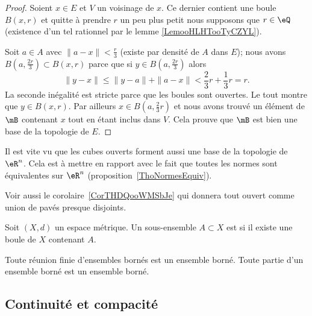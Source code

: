 \begin{proof}
	Soient \( x\in E\) et \( V\) un voisinage de \( x\). Ce dernier contient une boule \( B(x,r)\) et quitte à prendre \( r\) un peu plus petit nous supposons que \( r\in \eQ\) (existence d'un tel rationnel par le lemme \ref{LemooHLHTooTyCZYL}).

	Soit \( a\in A\) avec \( \| a-x \|<\frac{ r }{ 3 }\) (existe par densité de \( A\) dans \( E\)); nous avons \( B(a,\frac{ 2r }{ 3 })\subset B(x,r)\) parce que si \( y\in B( a,\frac{ 2r }{ 3 } )\) alors
	\begin{equation}
		\| y-x \|\leq \| y-a \|+\| a-x \|<\frac{ 2 }{ 3 }r+\frac{ 1 }{ 3 }r=r.
	\end{equation}
	La seconde inégalité est stricte parce que les boules sont ouvertes. Le tout montre que \( y\in B(x,r)\). Par ailleurs \( x\in B(a,\frac{ 2 }{ 3 }r)\) et nous avons trouvé un élément de \( \mB\) contenant \( x\) tout en étant inclus dans \( V\). Cela prouve que \( \mB\) est bien une base de la topologie de \( E\).
\end{proof}


\begin{remark}      \label{RemIPVLooHUXyeW}
	Il est vite vu que les cubes ouverts forment aussi une base de la topologie de \( \eR^n\). Cela est à mettre en rapport avec le fait que toutes les normes sont équivalentes sur \( \eR^n\) (proposition~\ref{ThoNormesEquiv}).


	Voir aussi le corolaire~\ref{CorTHDQooWMSbJe} qui donnera tout ouvert comme union de pavés presque disjoints.
\end{remark}

\begin{definition}\label{DefEnsembleBorne}
	Soit \( (X, d) \) un espace métrique. Un sous-ensemble \( A \subset X\) est  si il existe une boule de \( X\) contenant \( A\).
\end{definition}

\begin{proposition}     \label{PROPooJIOAooWqzKMu}
	Toute réunion finie d'ensembles bornés est un ensemble borné. Toute partie d'un ensemble borné est un ensemble borné.
\end{proposition}


\subsection{Continuité et compacité}

